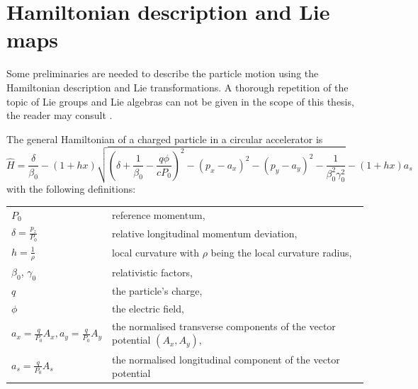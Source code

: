 \section{Hamiltonian description and Lie maps}
\label{sec_hamil_lie}

Some preliminaries are needed to describe the particle motion using the Hamiltonian description
and Lie transformations.
A thorough repetition of the topic of Lie groups and Lie algebras can not be given in the
scope of this thesis, the reader may consult \cite{Georgi1982}.

The general Hamiltonian of a charged particle in a circular accelerator is \cite{WolskiBook, Herr2020}
%
\begin{equation}
    \hat{H}=\frac{\delta}{\beta_0} - (1+hx)
    \sqrt{
      \left(\delta + \frac{1}{\beta_0} - \frac{q\phi}{cP_0}\right)^2 - (p_x-a_x)^2 - (p_y-a_y)^2
      - \frac{1}{\beta_0^2\gamma_0^2}
    }
    - (1+hx)a_s
\end{equation}
with the following definitions:

\begin{tabular}{ll}
  $P_0$ & reference momentum, \\
  $\delta = \frac{p_z}{P_0}$ & relative longitudinal momentum deviation, \\
  $h=\frac{1}{\rho}$ & local curvature with $\rho$ being the local curvature radius, \\
  $\beta_0$, $\gamma_0$ & relativistic factors, \\
  $q$ & the particle's charge, \\
  $\phi$ & the electric field, \\
  $a_x = \frac{q}{P_0}A_x, a_y = \frac{q}{P_0}A_y$ & the normalised transverse components of the vector potential $(A_x, A_y)$, \\
  $a_s = \frac{q}{P_0}A_s$ & the normalised longitudinal component of the vector potential
\end{tabular}

